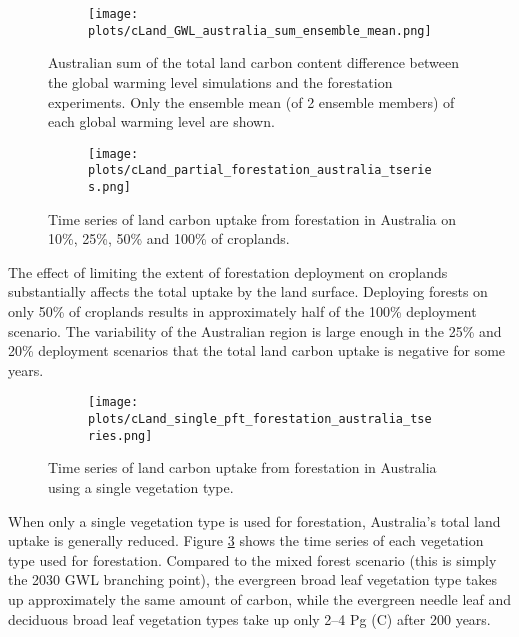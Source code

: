 \documentclass[]{article}
\begin{document}
\begin{figure}[H]
    \centering
    \begin{subfigure}[b]{\linewidth}
        \texttt{[image: plots/cLand\_GWL\_australia\_sum\_ensemble\_mean.png]}
    \end{subfigure}
    \caption{Australian sum of the total land carbon content difference between the global warming level simulations and the forestation experiments. Only the ensemble mean (of 2 ensemble members) of each global warming level are shown.}
    \label{fig:australia_cLand}
\end{figure}

\begin{figure}[H]
    \centering
    \begin{subfigure}[b]{\linewidth}
        \texttt{[image: plots/cLand\_partial\_forestation\_australia\_tseries.png]}
    \end{subfigure}
    \caption{Time series of land carbon uptake from forestation in Australia on 10\%, 25\%, 50\% and 100\% of croplands.}
    \label{fig:australia_cLand_tseries}
\end{figure}

The effect of limiting the extent of forestation deployment on croplands substantially affects the total uptake by the land surface.
Deploying forests on only 50\% of croplands results in approximately half of the 100\% deployment scenario.
The variability of the Australian region is large enough in the 25\% and 20\% deployment scenarios that the total land carbon uptake is negative for some years.

\begin{figure}[H]
    \centering
    \begin{subfigure}[b]{\linewidth}
        \texttt{[image: plots/cLand\_single\_pft\_forestation\_australia\_tseries.png]}
    \end{subfigure}
    \caption{Time series of land carbon uptake from forestation in Australia using a single vegetation type.}
    \label{fig:australia_cLand_tseries_veg_type}
\end{figure}

When only a single vegetation type is used for forestation, Australia's total land uptake is generally reduced.
Figure \ref{fig:australia_cLand_tseries_veg_type} shows the time series of each vegetation type used for forestation.
Compared to the mixed forest scenario (this is simply the 2030 GWL branching point), the evergreen broad leaf vegetation type takes up approximately the same amount of carbon, while the evergreen needle leaf and deciduous broad leaf vegetation types take up only 2--4 Pg (C) after 200 years.
\end{document}
